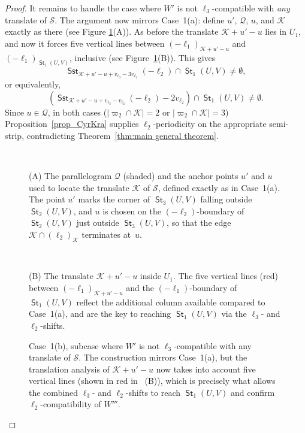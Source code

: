 \documentclass[12pt]{amsart}
\numberwithin{equation}{section}
\DeclareMathOperator{\st}{\mathsf{St}}
\DeclareMathOperator{\sst}{\mathsf{Sst}}
\begin{document}
\begin{proof}
\smallskip
It remains to handle the case where $W'$ is not $\pmb{\ell}_3$-compatible
with \emph{any} translate of $\mathcal{S}$. The argument now mirrors
Case~1(a): define $u'$, $\mathcal{Q}$, $u$, and $\mathcal{K}$
exactly as there (see Figure \ref{fig7}{\color{red}(A)}). As before the translate $\mathcal{K}+u'-
u$ lies in $U_1$, and now it forces five vertical lines between
$(-\pmb{\ell}_1)_{\mathcal{K}+u'-u}$ and
$(-\pmb{\ell}_1)_{\st_1(U,V)}$, inclusive
(see Figure~\ref{fig7}{\color{red}(B)}). This gives
\[
\sst_{\mathcal{K}+u'-u+v_{\pmb{\ell}_3}-3v_{\pmb{\ell}_2}}(-\pmb{\ell}_2) \cap \st_1(U,V) \neq  \emptyset,
\] 
or equivalently,
\[(
\sst_{\mathcal{K}+u'-u+v_{\pmb{\ell}_3}-v_{\pmb{\ell}_2}}(-\pmb{\ell}_2)-2v_{\pmb{\ell}_2}) \cap \st_1(U,V) \neq  \emptyset.
\]
Since $u \in \mathcal{Q}$, in both cases
($|\varpi_2 \cap \mathcal{K}|=2$ or $|\varpi_2 \cap \mathcal{K}|=3$)
Proposition~\ref{prop_CyrKra} supplies $\ell_2$-periodicity on the
appropriate semi-strip, contradicting Theorem~\ref{thm:main general theorem}.

\begin{figure}[ht]
	\begin{minipage}[t]{0.45\linewidth}
		\begin{center}
			\def\svgwidth{4.4cm}\\
		\end{center}
		\small{(A) The parallelogram $\mathcal{Q}$ (shaded) and the anchor
points $u'$ and $u$ used to locate the translate $\mathcal{K}$ of
$\mathcal{S}$, defined exactly as in Case~1(a). The point $u'$ marks
the corner of $\st_3(U,V)$ falling outside $\st_2(U,V)$, and $u$ is
chosen on the $(-\pmb{\ell}_2)$-boundary of $\st_2(U,V)$ just outside
$\st_3(U,V)$, so that the edge $\mathcal{K} \cap (\pmb{\ell}_2)_{\mathcal{K}}$ terminates at~$u$.}
	\end{minipage} 
	\hfill
	\begin{minipage}[t]{0.45\linewidth}
		\begin{center}
			\def\svgwidth{4.4cm}\\
		\end{center}
		\small{(B) The translate $\mathcal{K}+u'-u$ inside $U_1$. The five vertical lines (red) between $(-\pmb{\ell}_1)_{\mathcal{K}+u'-u}$ and the $(-\pmb{\ell}_1)$-boundary of $\st_1(U,V)$ reflect the additional column available compared to Case~1(a), and are the key to reaching $\st_1(U,V)$ via the $\pmb{\ell}_3$- and $\pmb{\ell}_2$-shifts.}
	\end{minipage}
	\caption{Case~1(b), subcase where $W'$ is not $\pmb{\ell}_3$-compatible with any translate of $\mathcal{S}$. The construction mirrors Case~1(a), but the translation analysis of $\mathcal{K}+u'-u$ now takes into account five vertical lines (shown in red in ~(B)), which is precisely what allows the combined $\pmb{\ell}_3$- and $\pmb{\ell}_2$-shifts to reach $\st_1(U,V)$ and confirm $\pmb{\ell}_2$-compatibility of $W'''$.}
	\label{fig7}
\end{figure}


\end{proof}
\end{document}
